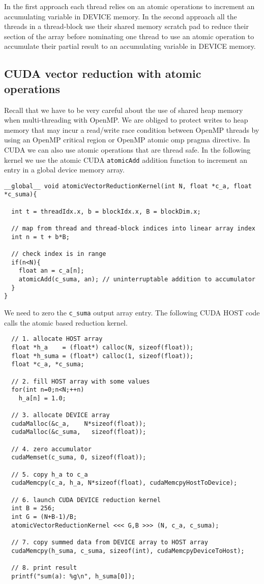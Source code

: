 
In the first approach each thread relies on an atomic operations to increment an accumulating variable in DEVICE memory. In the second approach all the threads in a thread-block use their shared memory scratch pad to reduce their section of the array before nominating one thread to use an atomic operation to accumulate their partial result to an accumulating variable in DEVICE memory.

\subsection{CUDA vector reduction with atomic operations}

 Recall that we have to be very careful about the use of shared heap memory when multi-threading with OpenMP. We are obliged to protect writes to heap memory that may incur a read/write race condition between OpenMP threads by using an OpenMP critical region or OpenMP atomic omp pragma directive. In CUDA we can also use atomic operations that are thread safe. In the following kernel we use the atomic CUDA \texttt{atomicAdd} addition function to increment an entry in a global device memory array.
 
\begin{verbatim}
__global__ void atomicVectorReductionKernel(int N, float *c_a, float *c_suma){

  int t = threadIdx.x, b = blockIdx.x, B = blockDim.x;

  // map from thread and thread-block indices into linear array index
  int n = t + b*B;

  // check index is in range
  if(n<N){
    float an = c_a[n];
    atomicAdd(c_suma, an); // uninterruptable addition to accumulator
  }
}
\end{verbatim}

We need to zero the \texttt{c\_suma} output array entry. The following CUDA HOST code calls the atomic based reduction kernel.

\begin{verbatim}
  // 1. allocate HOST array
  float *h_a    = (float*) calloc(N, sizeof(float));
  float *h_suma = (float*) calloc(1, sizeof(float));
  float *c_a, *c_suma;

  // 2. fill HOST array with some values
  for(int n=0;n<N;++n) 
    h_a[n] = 1.0;

  // 3. allocate DEVICE array
  cudaMalloc(&c_a,    N*sizeof(float));
  cudaMalloc(&c_suma,   sizeof(float));

  // 4. zero accumulator
  cudaMemset(c_suma, 0, sizeof(float));
  
  // 5. copy h_a to c_a
  cudaMemcpy(c_a, h_a, N*sizeof(float), cudaMemcpyHostToDevice);
  
  // 6. launch CUDA DEVICE reduction kernel
  int B = 256;
  int G = (N+B-1)/B;
  atomicVectorReductionKernel <<< G,B >>> (N, c_a, c_suma);

  // 7. copy summed data from DEVICE array to HOST array
  cudaMemcpy(h_suma, c_suma, sizeof(int), cudaMemcpyDeviceToHost);

  // 8. print result
  printf("sum(a): %g\n", h_suma[0]);
\end{verbatim}


